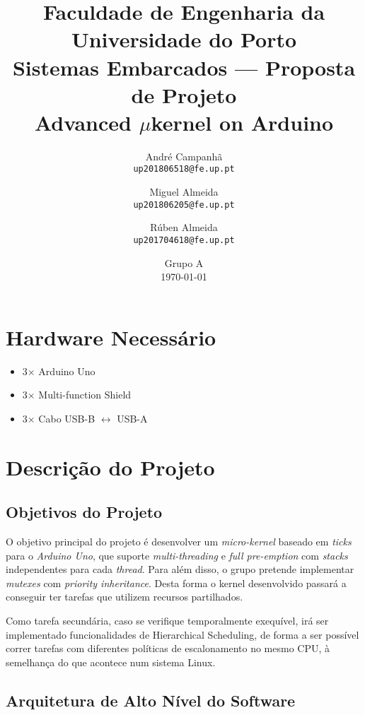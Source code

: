 \documentclass{article}
\title{{\normalsize Faculdade de Engenharia da Universidade do Porto}\\Sistemas Embarcados --- Proposta de Projeto\\\textbf{Advanced $\mu$kernel on Arduino}}
\author{André Campanhã\\\texttt{up201806518@fe.up.pt} \and Miguel Almeida\\\texttt{up201806205@fe.up.pt} \and Rúben Almeida\\\texttt{up201704618@fe.up.pt}}
\date{Grupo A\\\vspace{0.5em}\today}
\begin{document}
\maketitle

\section{Hardware Necessário}

\begin{itemize}
    \item 3$\times$ Arduino Uno
    \item 3$\times$ Multi-function Shield
    \item 3$\times$ Cabo USB-B $\longleftrightarrow$ USB-A
\end{itemize}

\section{Descrição do Projeto}

\subsection{Objetivos do Projeto}

O objetivo principal do projeto é desenvolver um \textit{micro-kernel} baseado em \textit{ticks} para o \textit{Arduino Uno}, que suporte \textit{multi-threading} e \textit{full pre-emption} com \textit{stacks} independentes para cada \textit{thread}. Para além disso, o grupo pretende implementar \textit{mutexes} com \textit{priority inheritance}. Desta forma o kernel desenvolvido passará a conseguir ter tarefas que utilizem recursos partilhados.

Como tarefa secundária, caso se verifique temporalmente exequível, irá ser implementado funcionalidades de Hierarchical Scheduling, de forma a ser possível correr tarefas com diferentes políticas de escalonamento no mesmo CPU, à semelhança do que acontece num sistema Linux.

\subsection{Arquitetura de Alto Nível do Software}
\end{document}

